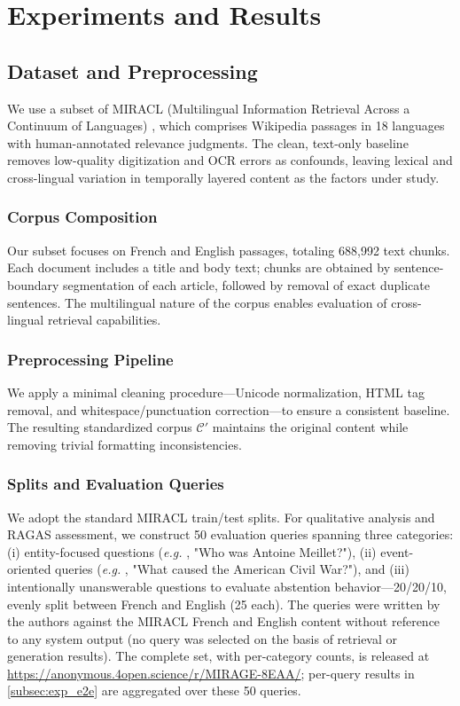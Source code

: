 \documentclass[11pt]{article}
\newcommand{\eg}{\textit{e.g. }}
\begin{document}
\section{Experiments and Results}
\label{sec:results}



\subsection{Dataset and Preprocessing}
\label{subsec:data_preprocessing}

We use a subset of MIRACL (Multilingual Information Retrieval Across a Continuum of Languages) \citep{zhang2023miracl}, which comprises Wikipedia passages in 18 languages with human-annotated relevance judgments. The clean, text-only baseline removes low-quality digitization and OCR errors as confounds, leaving lexical and cross-lingual variation in temporally layered content as the factors under study.

\subsubsection{Corpus Composition}
Our subset focuses on French and English passages, totaling 688,992 text chunks. Each document includes a title and body text; chunks are obtained by sentence-boundary segmentation of each article, followed by removal of exact duplicate sentences. The multilingual nature of the corpus enables evaluation of cross-lingual retrieval capabilities.

\subsubsection{Preprocessing Pipeline}
We apply a minimal cleaning procedure---Unicode normalization, HTML tag removal, and whitespace/punctuation correction---to ensure a consistent baseline. The resulting standardized corpus $\mathcal{C'}$ maintains the original content while removing trivial formatting inconsistencies.

\subsubsection{Splits and Evaluation Queries}
We adopt the standard MIRACL train/test splits. For qualitative analysis and RAGAS assessment, we construct 50 evaluation queries spanning three categories: (i) entity-focused questions (\eg, {\ttfamily "Who was Antoine Meillet?"}), (ii) event-oriented queries (\eg, {\ttfamily "What caused the American Civil War?"}), and (iii) intentionally unanswerable questions to evaluate abstention behavior---20/20/10, evenly split between French and English (25 each). The queries were written by the authors against the MIRACL French and English content without reference to any system output (no query was selected on the basis of retrieval or generation results). The complete set, with per-category counts, is released at \url{https://anonymous.4open.science/r/MIRAGE-8EAA/}; per-query results in \cref{subsec:exp_e2e} are aggregated over these 50 queries.
\end{document}
